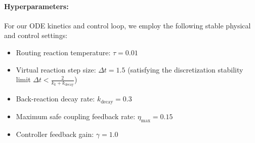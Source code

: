 \paragraph{Hyperparameters:} For our ODE kinetics and control loop, we employ the following stable physical and control settings:
\begin{itemize}
    \item Routing reaction temperature: $\tau = 0.01$
    \item Virtual reaction step size: $\Delta t = 1.5$ (satisfying the discretization stability limit $\Delta t < \frac{2}{k_k + k_{\text{decay}}}$)
    \item Back-reaction decay rate: $k_{\text{decay}} = 0.3$
    \item Maximum safe coupling feedback rate: $\eta_{\max} = 0.15$
    \item Controller feedback gain: $\gamma = 1.0$
\end{itemize}

